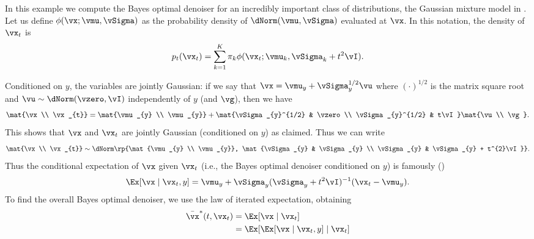\documentclass[../../book-main.tex]{subfiles}
\begin{document}
\begin{example}\label{example:denoising_gaussian_mixture}
	In this example we compute the Bayes optimal denoiser for an incredibly important class of distributions, the Gaussian mixture model in . Let us define \(\phi(\vx ; \vmu, \vSigma)\) as the probability density of \(\dNorm(\vmu, \vSigma)\) evaluated at \(\vx\). In this notation, the density of \(\vx_{t}\) is 
	\begin{equation}
		p_{t}(\vx_{t}) = \sum_{k = 1}^{K}\pi_{k}\phi(\vx_{t} ; \vmu_{k}, \vSigma_{k} + t^{2}\vI).
	\end{equation}

	Conditioned on \(y\), the variables are jointly Gaussian: if we say that \(\vx = \vmu_{y} + \vSigma_{y}^{1/2}\vu\) where \((\cdot)^{1/2}\) is the matrix square root and \(\vu \sim \dNorm(\vzero, \vI)\) independently of \(y\) (and \(\vg\)), then we have
	\begin{equation}
		\mat{\vx \\ \vx_{t}} = \mat{\vmu_{y} \\ \vmu_{y}} + \mat{\vSigma_{y}^{1/2} & \vzero \\ \vSigma_{y}^{1/2} & t\vI}\mat{\vu \\ \vg}.
	\end{equation}
	This shows that \(\vx\) and \(\vx_{t}\) are jointly Gaussian (conditioned on \(y\)) as claimed. Thus we can write
	\begin{equation}
		\mat{\vx \\ \vx_{t}} \sim \dNorm\rp{\mat{\vmu_{y} \\ \vmu_{y}}, \mat{\vSigma_{y} & \vSigma_{y} \\ \vSigma_{y} & \vSigma_{y} + t^{2}\vI}}.
	\end{equation}
	Thus the conditional expectation of \(\vx\) given \(\vx_{t}\) (i.e., the
	Bayes optimal denoiser conditioned on \(y\)) is famously
	()
	\begin{equation}
		\Ex[\vx \mid \vx_{t}, y] = \vmu_{y} + \vSigma_{y}(\vSigma_{y} + t^{2}\vI)^{-1}(\vx_{t} - \vmu_{y}).
	\end{equation}
	To find the overall Bayes optimal denoiser, we use the law of iterated expectation, obtaining
	\begin{align}
		\bar{\vx}^{\ast}(t, \vx_{t})
		&= \Ex[\vx \mid \vx_{t}] \\ 
		&= \Ex[\Ex[\vx \mid \vx_{t}, y] \mid \vx_{t}] \\ 

\end{align}
\end{example}
\end{document}
